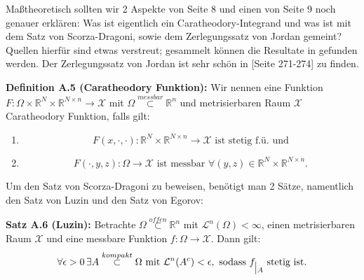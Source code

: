 \documentclass[
	language=german, %
	type=seminar, %
]{isthesis}
\begin{document}
\begin{appendix}
Maßtheoretisch sollten wir 2 Aspekte von Seite 8 und einen von Seite 9 noch genauer erklären: Was ist eigentlich ein Caratheodory-Integrand und was ist mit dem Satz von Scorza-Dragoni, sowie dem Zerlegungssatz von Jordan gemeint? Quellen hierfür sind etwas verstreut; gesammelt können die Resultate in \cite{CalcVar} gefunden werden. Der Zerlegungssatz von Jordan ist sehr schön in \cite{ElstrodtMeas}[Seite 271-274] zu finden.\\
\colorbox{defblue}{\begin{minipage}{16cm}{\textcolor{black}{}}
\textbf{Definition A.5 (Caratheodory Funktion):} Wir nennen eine Funktion \\ \(F:\Omega \times \mathbb{R}^N \times \mathbb{R}^{N \times n} \to \mathcal{X}\) mit \(\Omega \stackrel{messbar}{\subset} \mathbb{R}^n\) und metrisierbaren Raum \(\mathcal{X}\) Caratheodory Funktion, falls gilt:
\begin{enumerate}
\item \begin{equation}
    F(x,\cdot, \cdot):\mathbb{R}^N \times \mathbb{R}^{N \times n} \to \mathcal{X} \text{ ist stetig f.ü. und}
\end{equation}
\item \begin{equation}
    F(\cdot,y,z):\Omega \to \mathcal{X} \text{ ist messbar }\forall (y,z) \in \mathbb{R}^N \times \mathbb{R}^{N \times n}.
\end{equation}
\end{enumerate}
\end{minipage}}

Um den Satz von Scorza-Dragoni zu beweisen, benötigt man 2 Sätze, namentlich den Satz von Luzin und den Satz von Egorov:\\
\colorbox{theored}{\begin{minipage}{16cm}{\textcolor{black}{}}
\textbf{Satz A.6 (Luzin):} Betrachte \(\Omega \stackrel{offen}{\subset} \mathbb{R}^n\) mit \(\mathcal{L}^n(\Omega) < \infty\), einen metrisierbaren Raum \(\mathcal{X}\) und eine messbare Funktion \(f:\Omega \to \mathcal{X}\). Dann gilt:
\begin{equation}
    \forall \epsilon > 0\,\exists A \stackrel{kompakt}{\subset} \Omega \text{ mit } \mathcal{L}^n(A^c) < \epsilon, \text{ sodass } f_{\einschraenkung A} \text{ stetig ist}.
\end{equation}
\end{minipage}}


\end{appendix}
\end{document}
